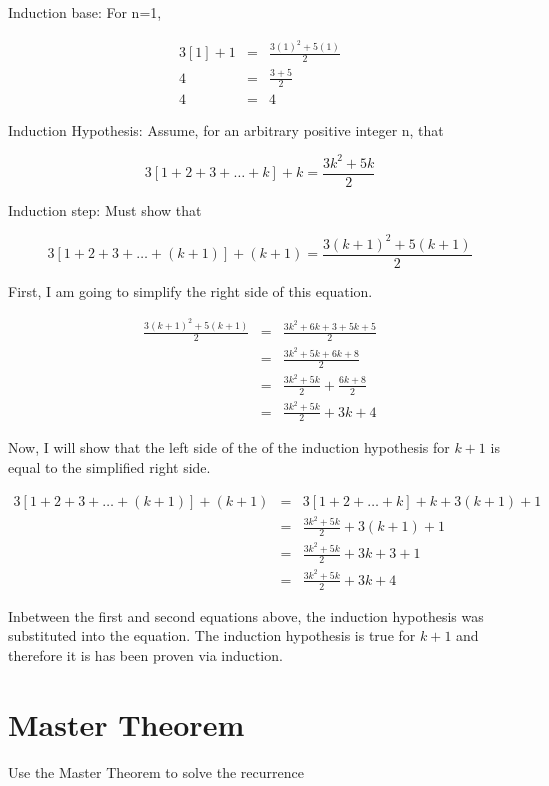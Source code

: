 \documentclass[11pt]{article}
\begin{document}
\bigskip

\noindent Induction base: For n=1,

\begin{eqnarray*}
3[1]+1 &=& \frac{3(1)^2 + 5(1)}{2} \\
4 &=& \frac{3+5}{2} \\
4 &=& 4
\end{eqnarray*}

\bigskip

\noindent Induction Hypothesis: Assume, for an arbitrary positive integer n, that 

\begin{equation*}
3[1+2+3+\dots+k] +k = \frac{3k^2 +5k}{2}
\end{equation*}

\bigskip

\noindent Induction step: Must show that

\begin{equation*}
3[1+2+3+\dots+(k+1)] +(k+1) = \frac{3(k+1)^2 +5(k+1)}{2}
\end{equation*}

\noindent First, I am going to simplify the right side of this equation.

\begin{eqnarray*}
\frac{3(k+1)^2 +5(k+1)}{2} &=& \frac{3k^2+6k+3+5k+5}{2} \\
	&=& \frac{3k^2+5k+6k+8}{2} \\
	&=& \frac{3k^2+5k}{2} + \frac{6k+8}{2} \\
	&=& \frac{3k^2+5k}{2} + 3k+4
\end{eqnarray*}

\noindent Now, I will show that the left side of the of the induction hypothesis for $k+1$ is equal to the simplified right side.

\begin{eqnarray*}
3[1+2+3+\dots+(k+1)] +(k+1) &=& 3[1+2+\dots+k] + k + 3(k+1)+1 \\
	&=& \frac{3k^2+5k}{2} + 3(k+1) +1 \\
	&=& \frac{3k^2+5k}{2} + 3k +3+1\\
	&=& \frac{3k^2+5k}{2} +3k+4
\end{eqnarray*}

\noindent Inbetween the first and second equations above, the induction hypothesis was substituted into the equation. The induction hypothesis is true for $k+1$ and therefore it is has been proven via induction.


\section{Master Theorem} %
Use the Master Theorem to solve the recurrence
\end{document}
